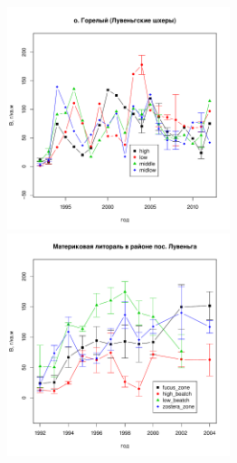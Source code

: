 \documentclass[12pt, a4paper]{article}
\begin{document}
\newpage
\begin{figure}[h]

\begin{minipage}[b]{.46\linewidth}
\begin{center}
\includegraphics[width=65mm]{../White_Sea/Luvenga_Goreliy/B_count_dynamic.pdf}
\end{center}
\end{minipage}
%
\hfil %
%
\begin{minipage}[b]{.46\linewidth}
\begin{center}
\includegraphics[width=65mm]{../White_Sea//Luvenga_II_razrez/B_count_dynamic.pdf}
\end{center}
\end{minipage}




\end{figure}
\end{document}
